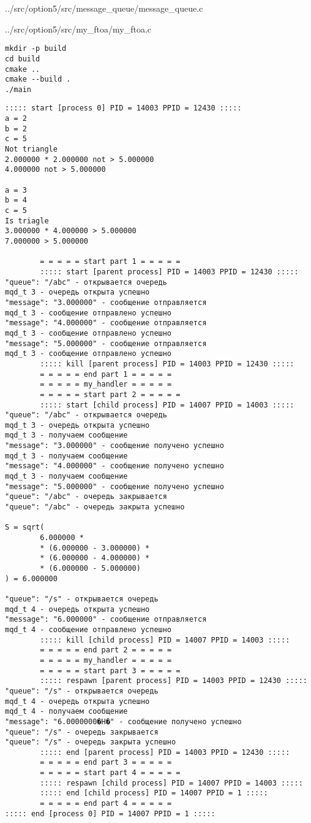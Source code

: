 
{../src/option5/src/message_queue/message_queue.c}


{../src/option5/src/my_ftoa/my_ftoa.c}

\newpage

\begin{lstlisting}[language=Terminal,]
mkdir -p build
cd build
cmake ..
cmake --build .
./main
\end{lstlisting}

\begin{lstlisting}[language=Out,]
::::: start [process 0] PID = 14003 PPID = 12430 :::::
a = 2
b = 2
c = 5
Not triangle
2.000000 * 2.000000 not > 5.000000
4.000000 not > 5.000000

a = 3
b = 4
c = 5
Is triagle
3.000000 * 4.000000 > 5.000000
7.000000 > 5.000000

        = = = = = start part 1 = = = = =
        ::::: start [parent process] PID = 14003 PPID = 12430 :::::
"queue": "/abc" - открывается очередь
mqd_t 3 - очередь открыта успешно
"message": "3.000000" - сообщение отправляется
mqd_t 3 - сообщение отправлено успешно
"message": "4.000000" - сообщение отправляется
mqd_t 3 - сообщение отправлено успешно
"message": "5.000000" - сообщение отправляется
mqd_t 3 - сообщение отправлено успешно
        ::::: kill [parent process] PID = 14003 PPID = 12430 :::::
        = = = = = end part 1 = = = = =
        = = = = = my_handler = = = = =
        = = = = = start part 2 = = = = =
        ::::: start [child process] PID = 14007 PPID = 14003 :::::
"queue": "/abc" - открывается очередь
mqd_t 3 - очередь открыта успешно
mqd_t 3 - получаем сообщение
"message": "3.000000" - сообщение получено успешно
mqd_t 3 - получаем сообщение
"message": "4.000000" - сообщение получено успешно
mqd_t 3 - получаем сообщение
"message": "5.000000" - сообщение получено успешно
"queue": "/abc" - очередь закрывается
"queue": "/abc" - очередь закрыта успешно

S = sqrt(
        6.000000 *
        * (6.000000 - 3.000000) *
        * (6.000000 - 4.000000) *
        * (6.000000 - 5.000000)
) = 6.000000

"queue": "/s" - открывается очередь
mqd_t 4 - очередь открыта успешно
"message": "6.000000" - сообщение отправляется
mqd_t 4 - сообщение отправлено успешно
        ::::: kill [child process] PID = 14007 PPID = 14003 :::::
        = = = = = end part 2 = = = = =
        = = = = = my_handler = = = = =
        = = = = = start part 3 = = = = =
        ::::: respawn [parent process] PID = 14003 PPID = 12430 :::::
"queue": "/s" - открывается очередь
mqd_t 4 - очередь открыта успешно
mqd_t 4 - получаем сообщение
"message": "6.0000000�H�" - сообщение получено успешно
"queue": "/s" - очередь закрывается
"queue": "/s" - очередь закрыта успешно
        ::::: end [parent process] PID = 14003 PPID = 12430 :::::
        = = = = = end part 3 = = = = =
        = = = = = start part 4 = = = = =
        ::::: respawn [child process] PID = 14007 PPID = 14003 :::::
        ::::: end [child process] PID = 14007 PPID = 1 :::::
        = = = = = end part 4 = = = = =
::::: end [process 0] PID = 14007 PPID = 1 :::::
\end{lstlisting}